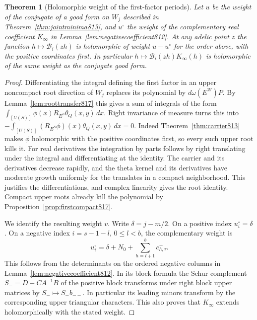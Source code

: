 \documentclass[a4paper,11pt]{article}
\newtheorem{theorem}[proposition]{Theorem}
\theoremstyle{definition}
\theoremstyle{remark}
\numberwithin{equation}{section}
\begin{document}
\begin{theorem}[Holomorphic weight of the first-factor periods]
\leavevmode\label{thm:firsthol817}
Let \(u\) be the weight of the conjugate of a good form on
\(W_j\) described in Theorem~\ref{thm:jointminima813},
and \(u^\circ\) the weight of the complementary real
coefficient \(K_\infty\) in Lemma~\ref{lem:negativecoefficient812}.
At any adelic point \(z\) the function
\(h\mapsto\mathcal B_i(zh)\) is holomorphic of weight
\(u-u^\circ\) for the order above, with the positive
coordinates first. In particular
\(h\mapsto\mathcal B_i(zh)K_\infty(h)\) is holomorphic
of the same weight as the conjugate good form.
\end{theorem}
\begin{proof}
Differentiating the integral defining the first factor
in an upper noncompact root direction of \(W_j\) replaces
its polynomial by \(d\omega(E^W)P\). By
Lemma~\ref{lem:roottransfer817} this gives a sum of integrals
of the form \(\int_{[U(S)]}\phi(x)R_{E^S}\theta_Q(x,y)\,dx\).
Right invariance of measure turns this into
\(-\int_{[U(S)]} (R_{E^S}\phi)(x)\theta_Q(x,y)\,dx=0\).
Indeed Theorem~\ref{thm:carrier813} makes \(\phi\)
holomorphic with the positive coordinates first, so every
such upper root kills it. For real derivatives the
integration by parts follows by right translating under
the integral and differentiating at the identity.
The carrier and its derivatives decrease rapidly, and
the theta kernel and its derivatives have moderate growth
uniformly for the translates in a compact neighborhood.
This justifies the differentiations, and complex linearity
gives the root identity. Compact upper roots already kill
the polynomial by Proposition~\ref{prop:firstcompact817}.

We identify the resulting weight \(v\). Write \(\delta=j-m/2\).
On a positive index \(u^\circ_i=\delta\). On a negative
index \(i=s-1-l\), \(0\le l<b\), the complementary weight is
\[
     u^\circ_i=\delta+N_0+\sum_{h=l+1}^b c^-_{h,\tau}.
\]
This follows from the determinants on the ordered negative
columns in Lemma~\ref{lem:negativecoefficient812}.
In its block formula the Schur complement \(S_-=D-CA^{-1}B\)
of the positive block transforms under right block upper
matrices by \(S_-\mapsto S_-b_{--}\). In particular its
leading minors transform by the corresponding upper
triangular characters. This also proves that \(K_\infty\)
extends holomorphically with the stated weight.


\end{proof}
\end{document}
